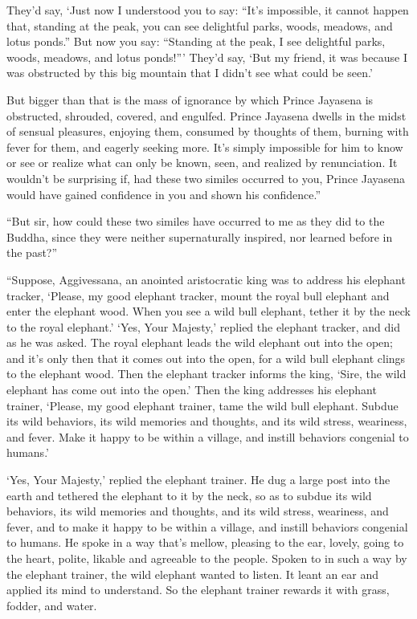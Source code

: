 \documentclass[12pt,openany]{book}%
\begin{document}
They’d say, ‘Just now I understood you to say: “It’s impossible, it cannot happen that, standing at the peak, you can see delightful parks, woods, meadows, and lotus ponds.” But now you say: “Standing at the peak, I see delightful parks, woods, meadows, and lotus ponds!”’ They’d say, ‘But my friend, it was because I was obstructed by this big mountain that I didn’t see what could be seen.’ 

But bigger than that is the mass of ignorance by which Prince Jayasena is obstructed, shrouded, covered, and engulfed. Prince Jayasena dwells in the midst of sensual pleasures, enjoying them, consumed by thoughts of them, burning with fever for them, and eagerly seeking more. It’s simply impossible for him to know or see or realize what can only be known, seen, and realized by renunciation. It wouldn’t be surprising if, had these two similes occurred to you, Prince Jayasena would have gained confidence in you and shown his confidence.” 

“But sir, how could these two similes have occurred to me as they did to the Buddha, since they were neither supernaturally inspired, nor learned before in the past?” 

“Suppose, Aggivessana, an anointed aristocratic king was to address his elephant tracker, ‘Please, my good elephant tracker, mount the royal bull elephant and enter the elephant wood. When you see a wild bull elephant, tether it by the neck to the royal elephant.’ ‘Yes, Your Majesty,’ replied the elephant tracker, and did as he was asked. The royal elephant leads the wild elephant out into the open; and it’s only then that it comes out into the open, for a wild bull elephant clings to the elephant wood. Then the elephant tracker informs the king, ‘Sire, the wild elephant has come out into the open.’ Then the king addresses his elephant trainer, ‘Please, my good elephant trainer, tame the wild bull elephant. Subdue its wild behaviors, its wild memories and thoughts, and its wild stress, weariness, and fever. Make it happy to be within a village, and instill behaviors congenial to humans.’ 

‘Yes, Your Majesty,’ replied the elephant trainer. He dug a large post into the earth and tethered the elephant to it by the neck, so as to subdue its wild behaviors, its wild memories and thoughts, and its wild stress, weariness, and fever, and to make it happy to be within a village, and instill behaviors congenial to humans. He spoke in a way that’s mellow, pleasing to the ear, lovely, going to the heart, polite, likable and agreeable to the people. Spoken to in such a way by the elephant trainer, the wild elephant wanted to listen. It leant an ear and applied its mind to understand. So the elephant trainer rewards it with grass, fodder, and water. 
\end{document}
